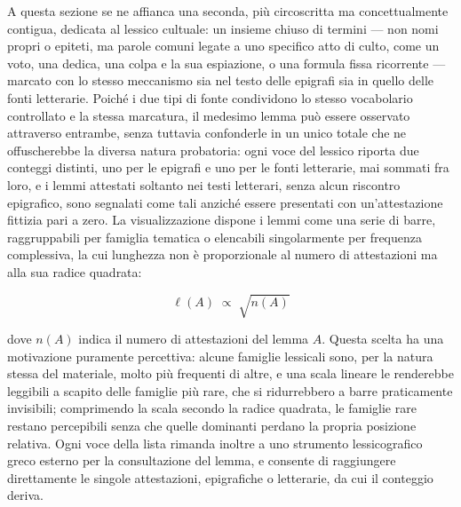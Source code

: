 \documentclass[11pt,a4paper]{article}
\begin{document}
A questa sezione se ne affianca una seconda, più circoscritta ma
concettualmente contigua, dedicata al lessico cultuale: un insieme chiuso
di termini --- non nomi propri o epiteti, ma parole comuni legate a uno
specifico atto di culto, come un voto, una dedica, una colpa e la sua
espiazione, o una formula fissa ricorrente --- marcato con lo stesso
meccanismo sia nel testo delle epigrafi sia in quello delle fonti
letterarie. Poiché i due tipi di fonte condividono lo stesso vocabolario
controllato e la stessa marcatura, il medesimo lemma può essere osservato
attraverso entrambe, senza tuttavia confonderle in un unico totale che ne
offuscherebbe la diversa natura probatoria: ogni voce del lessico riporta
due conteggi distinti, uno per le epigrafi e uno per le fonti letterarie,
mai sommati fra loro, e i lemmi attestati soltanto nei testi letterari,
senza alcun riscontro epigrafico, sono segnalati come tali anziché essere
presentati con un'attestazione fittizia pari a zero. La visualizzazione
dispone i lemmi come una serie di barre, raggruppabili per famiglia
tematica o elencabili singolarmente per frequenza complessiva, la cui
lunghezza non è proporzionale al numero di attestazioni ma alla sua
radice quadrata:

\[
  \ell(A) \;\propto\; \sqrt{n(A)}
\]

dove $n(A)$ indica il numero di attestazioni del lemma $A$. Questa scelta
ha una motivazione puramente percettiva: alcune famiglie lessicali sono,
per la natura stessa del materiale, molto più frequenti di altre, e una
scala lineare le renderebbe leggibili a scapito delle famiglie più rare,
che si ridurrebbero a barre praticamente invisibili; comprimendo la scala
secondo la radice quadrata, le famiglie rare restano percepibili senza
che quelle dominanti perdano la propria posizione relativa. Ogni voce
della lista rimanda inoltre a uno strumento lessicografico greco esterno
per la consultazione del lemma, e consente di raggiungere direttamente le
singole attestazioni, epigrafiche o letterarie, da cui il conteggio
deriva.
\end{document}
